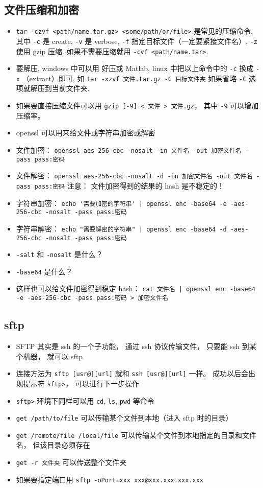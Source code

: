 \subsection{文件压缩和加密}
\begin{itemize}
\item \verb`tar -czvf <path/name.tar.gz> <some/path/or/file>` 是常见的压缩命令. 其中 \verb`-c` 是 create, \verb`-v` 是 verbose, \verb`-f` 指定目标文件（一定要紧接文件名）, \verb`-z` 使用 gzip 压缩. 如果不需要压缩就用 \verb`-cvf <path/name.tar>`.
\item 要解压, windows 中可以用 好压或 Matlab, linux 中把以上命令中的 \verb`-c` 换成 \verb`-x` （extract）即可, 如 \verb`tar -xzvf 文件.tar.gz -C 目标文件夹` 如果省略 \verb`-C` 选项就解压到当前文件夹.
\item 如果要直接压缩文件可以用 \verb|gzip [-9] < 文件 > 文件.gz|， 其中 \verb|-9| 可以增加压缩率。
\item openssl 可以用来给文件或字符串加密或解密
\item 文件加密： \verb`openssl aes-256-cbc -nosalt -in 文件名 -out 加密文件名 -pass pass:密码`
\item 文件解密： \verb`openssl aes-256-cbc -nosalt -d -in 加密文件名 -out 文件名 -pass pass:密码`
注意： 文件加密得到的结果的 hash 是不稳定的！
\item 字符串加密： \verb`echo '需要加密的字符串' | openssl enc -base64 -e -aes-256-cbc -nosalt -pass pass:密码`
\item 字符串解密： \verb`echo "需要解密的字符串" | openssl enc -base64 -d -aes-256-cbc -nosalt -pass pass:密码`
\item \verb`-salt` 和 \verb`-nosalt` 是什么？
\item \verb`-base64` 是什么？
\item 这样也可以给文件加密得到稳定 hash： \verb`cat 文件名 | openssl enc -base64 -e -aes-256-cbc -pass pass:密码 > 加密文件名`
\end{itemize}

\subsection{sftp}
\begin{itemize}
\item SFTP 其实是 ssh 的一个子功能， 通过 ssh 协议传输文件， 只要能 ssh 到某个机器， 就可以 sftp
\item 连接方法为 \verb`sftp [usr@][url]` 就和 \verb`ssh [usr@][url]` 一样。 成功以后会出现提示符 \verb`sftp>`， 可以进行下一步操作
\item \verb`sftp>` 环境下同样可以用 \verb`cd`, \verb`ls`, \verb`pwd` 等命令
\item \verb`get /path/to/file` 可以传输某个文件到本地（进入 sftp 时的目录）
\item \verb`get /remote/file /local/file` 可以传输某个文件到本地指定的目录和文件名， 但该目录必须存在
\item \verb`get -r 文件夹` 可以传送整个文件夹
\item 如果要指定端口用 \verb`sftp -oPort=xxx xxx@xxx.xxx.xxx.xxx`
\end{itemize}

